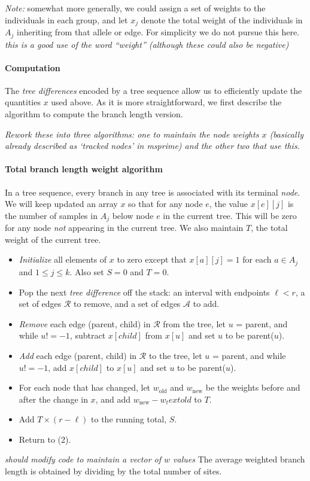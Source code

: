 \documentclass{article}
\newcommand{\plr}[1]{{\color{blue} \it #1}}
\begin{document}
\emph{Note:} somewhat more generally,
we could assign a set of weights to the individuals in each group,
and let $x_j$ denote the total weight of the individuals in $A_j$
inheriting from that allele or edge.
For simplicity we do not pursue this here.
\plr{this is a good use of the word ``weight'' (although these could also be negative)}


\paragraph{Computation}
The \emph{tree differences} encoded by a tree sequence allow us to efficiently update the quantities $x$ used above.
As it is more straightforward, we first describe the algorithm
to compute the branch length version.

\plr{Rework these into three algorithms: one to maintain the node weights $x$
    (basically already described as `tracked nodes' in msprime)
    and the other two that use this.}

\paragraph{Total branch length weight algorithm}
In a tree sequence, every branch in any tree is associated with its terminal \emph{node}.
We will keep updated an array $x$ so that for any node $e$,
the value $x[e][j]$ is the number of samples in $A_j$ below node $e$ in the current tree.
This will be zero for any node \emph{not} appearing in the current tree.
We also maintain $T$, the total weight of the current tree.
\begin{itemize}
    \item \emph{Initialize} all elements of $x$ to zero
        except that $x[a][j] = 1$ for each $a \in A_j$ and $1 \le j \le k$.
        Also set $S=0$ and $T=0$.
    \item Pop the next \emph{tree difference} off the stack: an interval with endpoints $\ell < r$,
        a set of edges $\mathcal{R}$ to remove, and a set of edges $\mathcal{A}$ to add.
    \item \emph{Remove} each edge (parent, child) in $\mathcal{R}$ from the tree,
        let $u$ = parent, and while $u != -1$,
        subtract $x[child]$ from $x[u]$ and set $u$ to be parent($u$).
    \item \emph{Add} each edge (parent, child) in $\mathcal{R}$ to the tree,
        let $u$ = parent, and while $u != -1$,
        add $x[child]$ to $x[u]$ and set $u$ to be parent($u$).
    \item For each node that has changed, let $w_\text{old}$ and $w_\text{new}$
        be the weights before and after the change in $x$,
        and add $w_\text{new} - w_text{old}$ to $T$.
    \item Add $T \times (r-\ell)$ to the running total, $S$.
    \item Return to (2).
\end{itemize}
\plr{should modify code to maintain a vector of $w$ values}
The average weighted branch length is obtained by dividing by the total number of sites.
\end{document}
